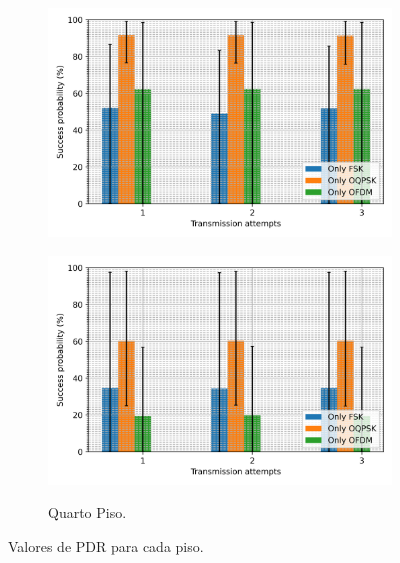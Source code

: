 \begin{figure}[ht!]
\begin{subfigure}{.4\textwidth}
            \includegraphics[width=\textwidth]{./sections/textual/chapters/images/mod_3_floor.png}
            \label{fig:piso3}
      \end{subfigure}
      \begin{subfigure}{.4\textwidth}
            \centering
            \caption{Quarto Piso.}
            \includegraphics[width=\textwidth]{./sections/textual/chapters/images/mod_4_floor.png}
            \label{fig:piso4}
      \end{subfigure}
      \caption{Valores de PDR para cada piso.}
      \label{fig:pdr_andar}
\end{figure}


